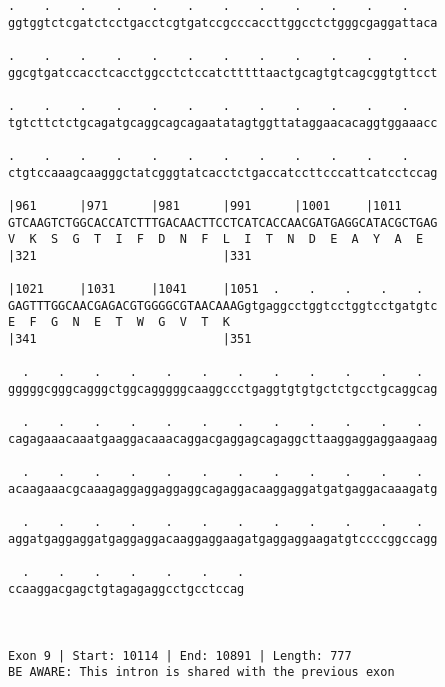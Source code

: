 \documentclass{article}
\begin{document}
\begin{Verbatim}
.    .    .    .    .    .    .    .    .    .    .    .    
ggtggtctcgatctcctgacctcgtgatccgcccaccttggcctctgggcgaggattaca
                                                            
.    .    .    .    .    .    .    .    .    .    .    .    
ggcgtgatccacctcacctggcctctccatctttttaactgcagtgtcagcggtgttcct
                                                            
.    .    .    .    .    .    .    .    .    .    .    .    
tgtcttctctgcagatgcaggcagcagaatatagtggttataggaacacaggtggaaacc
                                                            
.    .    .    .    .    .    .    .    .    .    .    .    
ctgtccaaagcaagggctatcgggtatcacctctgaccatccttcccattcatcctccag
                                                            
|961      |971      |981      |991      |1001     |1011     
GTCAAGTCTGGCACCATCTTTGACAACTTCCTCATCACCAACGATGAGGCATACGCTGAG
V  K  S  G  T  I  F  D  N  F  L  I  T  N  D  E  A  Y  A  E  
|321                          |331                          
  
|1021     |1031     |1041     |1051  .    .    .    .    .  
GAGTTTGGCAACGAGACGTGGGGCGTAACAAAGgtgaggcctggtcctggtcctgatgtc
E  F  G  N  E  T  W  G  V  T  K                             
|341                          |351                          
  
  .    .    .    .    .    .    .    .    .    .    .    .  
gggggcgggcagggctggcagggggcaaggccctgaggtgtgtgctctgcctgcaggcag
                                                            
  .    .    .    .    .    .    .    .    .    .    .    .  
cagagaaacaaatgaaggacaaacaggacgaggagcagaggcttaaggaggaggaagaag
                                                            
  .    .    .    .    .    .    .    .    .    .    .    .  
acaagaaacgcaaagaggaggaggaggcagaggacaaggaggatgatgaggacaaagatg
                                                            
  .    .    .    .    .    .    .    .    .    .    .    .  
aggatgaggaggatgaggaggacaaggaggaagatgaggaggaagatgtccccggccagg
                                                            
  .    .    .    .    .    .    .
ccaaggacgagctgtagagaggcctgcctccag
                                 
                                 
 
Exon 9 | Start: 10114 | End: 10891 | Length: 777
BE AWARE: This intron is shared with the previous exon
 

\end{Verbatim}
\end{document}
